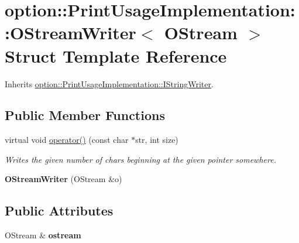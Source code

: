 \hypertarget{structoption_1_1_print_usage_implementation_1_1_o_stream_writer}{\section{option\-:\-:\-Print\-Usage\-Implementation\-:\-:\-O\-Stream\-Writer$<$ \-O\-Stream $>$ \-Struct \-Template \-Reference}
\label{structoption_1_1_print_usage_implementation_1_1_o_stream_writer}
}


\-Inherits \hyperlink{structoption_1_1_print_usage_implementation_1_1_i_string_writer}{option\-::\-Print\-Usage\-Implementation\-::\-I\-String\-Writer}.

\subsection*{\-Public \-Member \-Functions}
\begin{DoxyCompactItemize}
\item 
\hypertarget{structoption_1_1_print_usage_implementation_1_1_o_stream_writer_a323890fba123ad476fa2471029fc7b23}{virtual void \hyperlink{structoption_1_1_print_usage_implementation_1_1_o_stream_writer_a323890fba123ad476fa2471029fc7b23}{operator()} (const char $\ast$str, int size)}\label{structoption_1_1_print_usage_implementation_1_1_o_stream_writer_a323890fba123ad476fa2471029fc7b23}

\begin{DoxyCompactList}\small\item\em \-Writes the given number of chars beginning at the given pointer somewhere. \end{DoxyCompactList}\item 
\hypertarget{structoption_1_1_print_usage_implementation_1_1_o_stream_writer_abf38eb181267e96d86de1ea09ad22c3f}{{\bfseries \-O\-Stream\-Writer} (\-O\-Stream \&o)}\label{structoption_1_1_print_usage_implementation_1_1_o_stream_writer_abf38eb181267e96d86de1ea09ad22c3f}

\end{DoxyCompactItemize}
\subsection*{\-Public \-Attributes}
\begin{DoxyCompactItemize}
\item 
\hypertarget{structoption_1_1_print_usage_implementation_1_1_o_stream_writer_a9b808696e204a834acd4362c62b9f4c1}{\-O\-Stream \& {\bfseries ostream}}\label{structoption_1_1_print_usage_implementation_1_1_o_stream_writer_a9b808696e204a834acd4362c62b9f4c1}

\end{DoxyCompactItemize}

